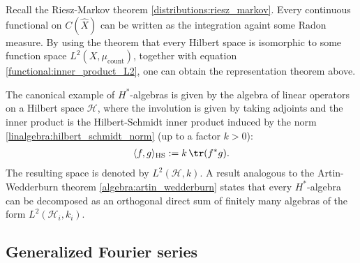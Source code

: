     \begin{remark}
        Recall the Riesz-Markov theorem \ref{distributions:riesz_markov}. Every continuous functional on $C(\widehat{X})$ can be written as the integration againt some Radon measure. By using the theorem that every Hilbert space is isomorphic to some function space $L^2(X,\mu_\mathrm{count})$, together with equation \eqref{functional:inner_product_L2}, one can obtain the representation theorem above.
    \end{remark}

    \begin{example}\label{functional:hilbert_schmidt_inner_product}
        The canonical example of $H^*$-algebras is given by the algebra of linear operators on a Hilbert space $\mathcal{H}$, where the involution is given by taking adjoints and the inner product is the Hilbert-Schmidt inner product induced by the norm \ref{linalgebra:hilbert_schmidt_norm} (up to a factor $k>0$):
        \begin{gather}
            \langle f,g \rangle_\mathrm{HS} := k\,\tr(f^*g).
        \end{gather}
        The resulting space is denoted by $L^2(\mathcal{H},k)$. A result analogous to the Artin-Wedderburn theorem \ref{algebra:artin_wedderburn} states that every $H^*$-algebra can be decomposed as an orthogonal direct sum of finitely many algebras of the form $L^2(\mathcal{H}_i,k_i)$.
    \end{example}

\subsection{Generalized Fourier series}

